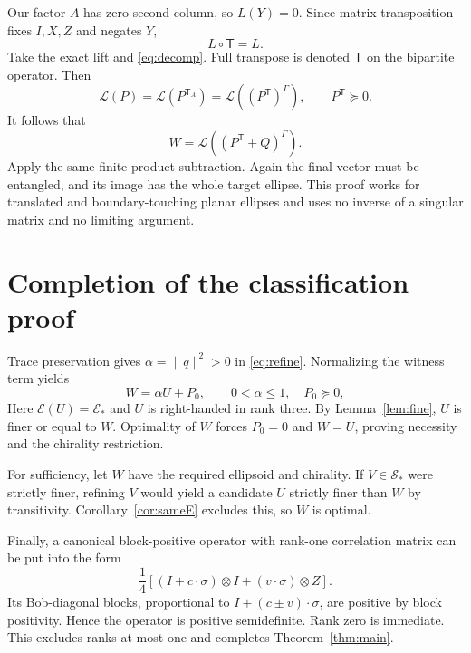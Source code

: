\documentclass[11pt,a4paper]{article}
\theoremstyle{definition}\newtheorem{definition}[theorem]{Definition}
\newcommand{\E}{\mathcal E}
\newcommand{\Sstar}{\mathcal S_*}
\theoremstyle{plain}\newtheorem*{theorem*}{Theorem}
\begin{document}
Our factor $A$ has zero second column, so $L(Y)=0$. Since matrix transposition fixes $I,X,Z$ and negates $Y$,
\begin{equation}\label{eq:transpose}
 L\circ\mathsf T=L.
\end{equation}
Take the exact lift and \eqref{eq:decomp}. Full transpose is denoted $\mathsf T$ on the bipartite operator. Then
\[
 \mathscr L(P)=\mathscr L(P^{\mathsf T_A})
 =\mathscr L((P^{\mathsf T})^\Gamma),\qquad P^{\mathsf T}\succeq0.
\]
It follows that
\[
 W=\mathscr L((P^{\mathsf T}+Q)^\Gamma).
\]
Apply the same finite product subtraction. Again the final vector must be entangled, and its image has the whole target ellipse. This proof works for translated and boundary-touching planar ellipses and uses no inverse of a singular matrix and no limiting argument.

\section{Completion of the classification proof}

Trace preservation gives $\alpha=\|q\|^2>0$ in \eqref{eq:refine}. Normalizing the witness term yields
\[
 W=\alpha U+P_0,\qquad 0<\alpha\leq1,\quad P_0\succeq0,
\]
Here $\E(U)=\E_*$ and $U$ is right-handed in rank three. By Lemma~\ref{lem:fine}, $U$ is finer or equal to $W$. Optimality of $W$ forces $P_0=0$ and $W=U$, proving necessity and the chirality restriction.

For sufficiency, let $W$ have the required ellipsoid and chirality. If $V\in\Sstar$ were strictly finer, refining $V$ would yield a candidate $U$ strictly finer than $W$ by transitivity. Corollary~\ref{cor:sameE} excludes this, so $W$ is optimal.

Finally, a canonical block-positive operator with rank-one correlation matrix can be put into the form
\[
 \frac14\left[(I+c\cdot\sigma)\otimes I+(v\cdot\sigma)\otimes Z\right].
\]
Its Bob-diagonal blocks, proportional to $I+(c\pm v)\cdot\sigma$, are positive by block positivity. Hence the operator is positive semidefinite. Rank zero is immediate. This excludes ranks at most one and completes Theorem~\ref{thm:main}.


\clearpage

\clearpage
\end{document}
